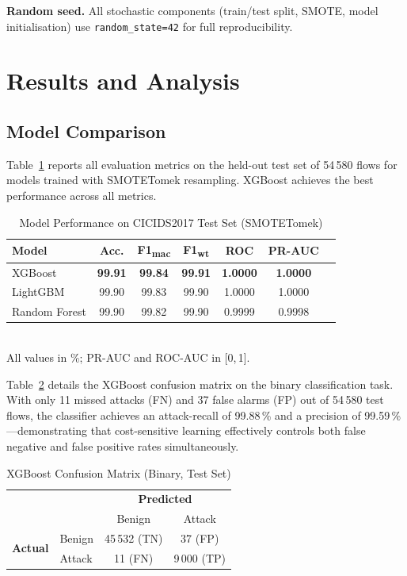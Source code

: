 \documentclass[conference]{IEEEtran}
\begin{document}
\textbf{Random seed.}
All stochastic components (train/test split, SMOTE, model initialisation)
use \texttt{random\_state=42} for full reproducibility.

\section{Results and Analysis}
\label{sec:results}

\subsection{Model Comparison}

Table~\ref{tab:results} reports all evaluation metrics on the held-out
test set of 54\,580 flows for models trained with SMOTETomek resampling.
XGBoost achieves the best performance across all metrics.

\begin{table}[ht]
\caption{Model Performance on CICIDS2017 Test Set (SMOTETomek)}
\label{tab:results}
\centering
\setlength{\tabcolsep}{4pt}
\begin{tabular}{lcccccc}
\toprule
\textbf{Model} & \textbf{Acc.} & \textbf{F1\textsubscript{mac}} &
\textbf{F1\textsubscript{wt}} & \textbf{ROC} & \textbf{PR-AUC} \\
\midrule
XGBoost       & \textbf{99.91} & \textbf{99.84} & \textbf{99.91}
              & \textbf{1.0000} & \textbf{1.0000} \\
LightGBM      & 99.90 & 99.83 & 99.90 & 1.0000 & 1.0000 \\
Random Forest & 99.90 & 99.82 & 99.90 & 0.9999 & 0.9998 \\
\bottomrule
\end{tabular}\\[2pt]
\small All values in \%; PR-AUC and ROC-AUC in [0,\,1].
\end{table}

Table~\ref{tab:cm} details the XGBoost confusion matrix on the binary
classification task. With only 11 missed attacks (FN) and 37 false alarms
(FP) out of 54\,580 test flows, the classifier achieves an attack-recall
of 99.88\,\% and a precision of 99.59\,\%—demonstrating that
cost-sensitive learning effectively controls both false negative
and false positive rates simultaneously.

\begin{table}[ht]
\caption{XGBoost Confusion Matrix (Binary, Test Set)}
\label{tab:cm}
\centering
\begin{tabular}{llcc}
\toprule
& & \multicolumn{2}{c}{\textbf{Predicted}} \\
& & Benign & Attack \\
\midrule
\multirow{2}{*}{\textbf{Actual}} & Benign & 45\,532 (TN) &     37 (FP) \\
                                  & Attack &     11 (FN)  &  9\,000 (TP) \\
\bottomrule
\end{tabular}
\end{table}
\end{document}
